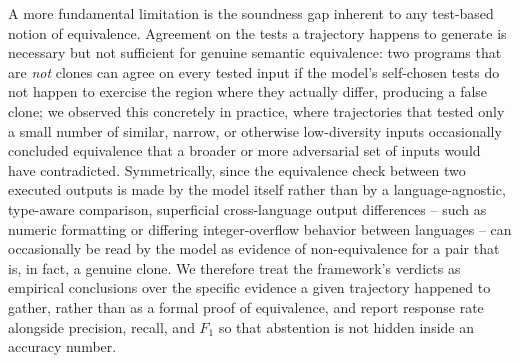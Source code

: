 A more fundamental limitation is the soundness gap inherent to any
test-based notion of equivalence. Agreement on the tests a trajectory
happens to generate is necessary but not sufficient for genuine semantic
equivalence: two programs that are \emph{not} clones can agree on every
tested input if the model's self-chosen tests do not happen to exercise the
region where they actually differ, producing a false clone; we observed this
concretely in practice, where trajectories that tested only a small number of
similar, narrow, or otherwise low-diversity inputs occasionally concluded
equivalence that a broader or more adversarial set of inputs would have
contradicted. Symmetrically, since the equivalence check between two
executed outputs is made by the model itself rather than by a
language-agnostic, type-aware comparison, superficial cross-language output
differences -- such as numeric formatting or differing integer-overflow
behavior between languages -- can occasionally be read by the model as
evidence of non-equivalence for a pair that is, in fact, a genuine clone. We
therefore treat the framework's verdicts as empirical conclusions over the
specific evidence a given trajectory happened to gather, rather than as a
formal proof of equivalence, and report response rate alongside precision,
recall, and $F_1$ so that abstention is not hidden inside an accuracy number.
